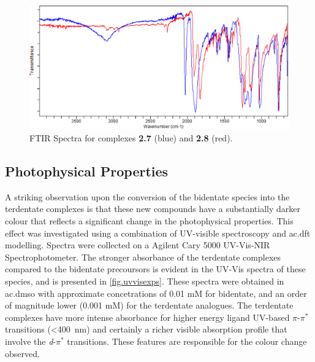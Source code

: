 \begin{figure}[!htb]
 \centering
 \includegraphics[clip=true, width=\textwidth, keepaspectratio]{images/ftir7and8.eps}
 \caption[FTIR Spectra for complexes \textbf{2.7} and \textbf{2.8}]{FTIR Spectra for complexes \textbf{2.7} (blue) and \textbf{2.8} (red).}
 \label{fig.ir78}
\end{figure}

\FloatBarrier
\subsection{Photophysical Properties}

A striking observation upon the conversion of the bidentate species into the terdentate complexes is that these new compounds have a substantially darker colour that reflects a significant change in the photophysical properties. This effect was investigated using a combination of UV-visible spectroscopy and \gls{ac.dft} modelling. Spectra were collected on a Agilent Cary 5000 UV-Vis-NIR Spectrophotometer. The stronger absorbance of the terdentate complexes compared to the bidentate precoursors is evident in the UV-Vis spectra of these species, and is presented in \autoref{fig.uvvisexps}. These spectra were obtained in \gls{ac.dmso} with approximate concetrations of 0.01 mM for bidentate, and an order of magnitude lower (0.001 mM) for the terdentate analogues. The terdentate complexes have more intense absorbance for higher energy ligand UV-based $\pi$-$\pi^\ast$ transitions (\textless 400~nm) and certainly a richer visible absorption profile that involve the \textit{d}-$\pi^\ast$ transitions. These features are responsible for the colour change observed.

